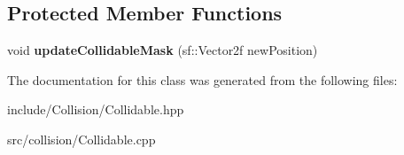 \subsection*{Protected Member Functions}
\begin{DoxyCompactItemize}
\item 
\hypertarget{classcollision_1_1_collidable_a715cd89e24e97798727d7cf39b9b8089}{}void {\bfseries update\+Collidable\+Mask} (sf\+::\+Vector2f new\+Position)\label{classcollision_1_1_collidable_a715cd89e24e97798727d7cf39b9b8089}

\end{DoxyCompactItemize}


The documentation for this class was generated from the following files\+:\begin{DoxyCompactItemize}
\item 
include/\+Collision/Collidable.\+hpp\item 
src/collision/Collidable.\+cpp\end{DoxyCompactItemize}
